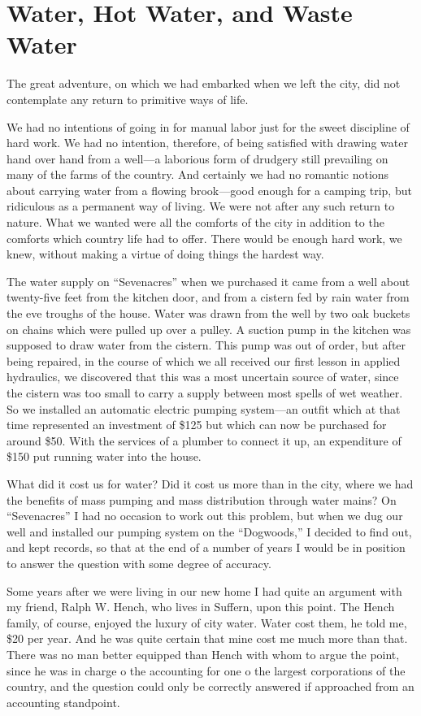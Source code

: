 \documentclass{book}
\begin{document}
\chapter{Water, Hot Water, and Waste Water}
\label{chapter-6}
The great adventure, on which we had embarked when we left the city, did not contemplate any return to primitive ways of life.

We had no intentions of going in for manual labor just for the sweet discipline of hard work. We had no intention, therefore, of being satisfied with drawing water hand over hand from a well—a laborious form of drudgery still prevailing on many of the farms of the country. And certainly we had no romantic notions about carrying water from a flowing brook—good enough for a camping trip, but ridiculous as a permanent way of living. We were not after any such return to nature. What we wanted were all the comforts of the city in addition to the comforts which country life had to offer. There would be enough hard work, we knew, without making a virtue of doing things the hardest way.

The water supply on “Sevenacres” when we purchased it came from a well about twenty-five feet from the kitchen door, and from a cistern fed by rain water from the eve troughs of the house. Water was drawn from the well by two oak buckets on chains which were pulled up over a pulley. A suction pump in the kitchen was supposed to draw water from the cistern. This pump was out of order, but after being repaired, in the course of which we all received our first lesson in applied hydraulics, we discovered that this was a most uncertain source of water, since the cistern was too small to carry a supply between most spells of wet weather. So we installed an automatic electric pumping system—an outfit which at that time represented an investment of \$125 but which can now be purchased for around \$50. With the services of a plumber to connect it up, an expenditure of \$150 put running water into the house.

What did it cost us for water? Did it cost us more than in the city, where we had the benefits of mass pumping and mass distribution through water mains? On “Sevenacres” I had no occasion to work out this problem, but when we dug our well and installed our pumping system on the “Dogwoods,” I decided to find out, and kept records, so that at the end of a number of years I would be in position to answer the question with some degree of accuracy.

Some years after we were living in our new home I had quite an argument with my friend, Ralph W. Hench, who lives in Suffern, upon this point. The Hench family, of course, enjoyed the luxury of city water. Water cost them, he told me, \$20 per year. And he was quite certain that mine cost me much more than that. There was no man better equipped than Hench with whom to argue the point, since he was in charge o the accounting for one o the largest corporations of the country, and the question could only be correctly answered if approached from an accounting standpoint.
\end{document}
